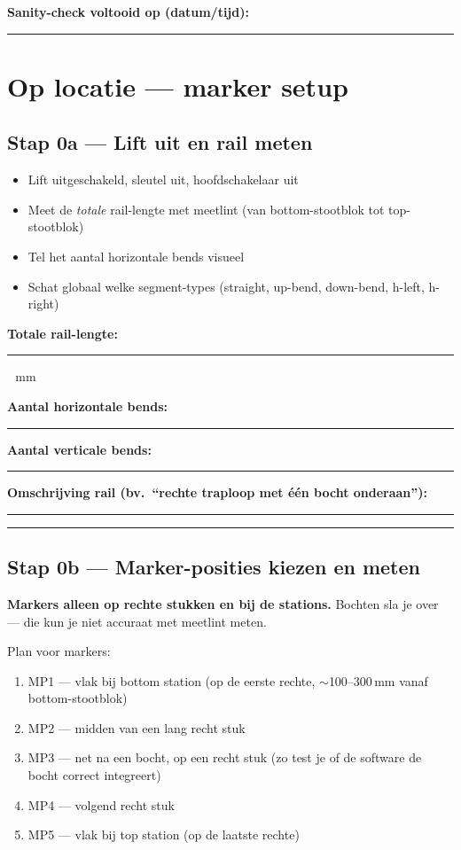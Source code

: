 \documentclass[11pt, a4paper]{article}
\newcommand{\fillline}{\rule[-0.5ex]{4cm}{0.4pt}}
\newcommand{\fillshort}{\rule[-0.5ex]{2cm}{0.4pt}}
\newcommand{\filllong}{\rule[-0.5ex]{6cm}{0.4pt}}
\newcommand{\fillblock}[1]{\rule[-0.5ex]{#1}{0.4pt}}
\begin{document}
\textbf{Sanity-check voltooid op (datum/tijd):} \filllong

\newpage
\section{Op locatie — marker setup}

\subsection{Stap 0a — Lift uit en rail meten}

\begin{itemize}[leftmargin=2em, label=$\square$]
  \item Lift uitgeschakeld, sleutel uit, hoofdschakelaar uit
  \item Meet de \emph{totale} rail-lengte met meetlint (van bottom-stootblok tot top-stootblok)
  \item Tel het aantal horizontale bends visueel
  \item Schat globaal welke segment-types (straight, up-bend, down-bend, h-left, h-right)
\end{itemize}

\textbf{Totale rail-lengte:} \fillline\ \,mm

\textbf{Aantal horizontale bends:} \fillshort\hfill \textbf{Aantal verticale bends:} \fillshort

\textbf{Omschrijving rail (bv.\ ``rechte traploop met één bocht onderaan''):}

\fillblock{\textwidth}

\fillblock{\textwidth}

\subsection{Stap 0b — Marker-posities kiezen en meten}

\textbf{Markers alleen op rechte stukken en bij de stations.} Bochten
sla je over --- die kun je niet accuraat met meetlint meten.

Plan voor markers:
\begin{enumerate}[leftmargin=2em]
  \item MP1 --- vlak bij bottom station (op de eerste rechte, $\sim$100--300\,mm vanaf bottom-stootblok)
  \item MP2 --- midden van een lang recht stuk
  \item MP3 --- net na een bocht, op een recht stuk (zo test je of de software de bocht correct integreert)
  \item MP4 --- volgend recht stuk
  \item MP5 --- vlak bij top station (op de laatste rechte)
\end{enumerate}
\end{document}
